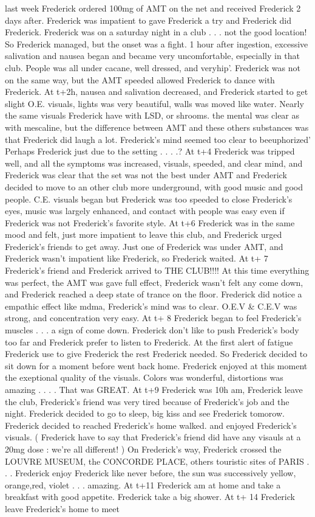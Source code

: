 \documentclass[12pt]{book}
\begin{document}
last week Frederick ordered 100mg of AMT on the net and received Frederick 2 days after. Frederick was impatient to gave Frederick a try and Frederick did Frederick. Frederick was on a saturday night in a club . . .  not the good location! So Frederick managed, but the onset was a fight. 1 hour after ingestion, excessive salivation and nausea began and became very uncomfortable, especially in that club. People was all under cacane, well dressed, and veryhip'. Frederick was not on the same way, but the AMT speeded allowed Frederick to dance with Frederick. At t+2h, nausea and salivation decreased, and Frederick started to get slight O.E. visuals, lights was very beautiful, walls was moved like water. Nearly the same visuals Frederick have with LSD, or shrooms. the mental was clear as with mescaline, but the difference between AMT and these others substances was that Frederick did laugh a lot. Frederick's mind seemed too clear to beeuphorized' Perhaps Frederick just due to the setting . . . .? At t+4 Frederick was tripped well, and all the symptoms was increased, visuals, speeded, and clear mind, and Frederick was clear that the set was not the best under AMT and Frederick decided to move to an other club more underground, with good music and good people. C.E. visuals began but Frederick was too speeded to close Frederick's eyes, music was largely enhanced, and contact with people was easy even if Frederick was not Frederick's favorite style. At t+6 Frederick was in the same mood and felt, just more impatient to leave this club, and Frederick urged Frederick's friends to get away. Just one of Frederick was under AMT, and Frederick wasn't impatient like Frederick, so Frederick waited. At t+ 7 Frederick's friend and Frederick arrived to THE CLUB!!!! At this time everything was perfect, the AMT was gave full effect, Frederick wasn't felt any come down, and Frederick reached a deep state of trance on the floor. Frederick did notice a empathic effect like mdma, Frederick's mind was to clear. O.E.V \& C.E.V was strong, and concentration very easy. At t+ 8 Frederick began to feel Frederick's muscles . . .  a sign of come down. Frederick don't like to push Frederick's body too far and Frederick prefer to listen to Frederick. At the first alert of fatigue Frederick use to give Frederick the rest Frederick needed. So Frederick decided to sit down for a moment before went back home. Frederick enjoyed at this moment the exeptional quality of the visuals. Colors was wonderful, distortions was amazing . . .  . That was GREAT. At t+9 Frederick was 10h am, Frederick leave the club, Frederick's friend was very tired because of Frederick's job and the night. Frederick decided to go to sleep, big kiss and see Frederick tomorow. Frederick decided to reached Frederick's home walked. and enjoyed Frederick's visuals. ( Frederick have to say that Frederick's friend did have any visauls at a 20mg dose : we're all different! ) On Frederick's way, Frederick crossed the LOUVRE MUSEUM, the CONCORDE PLACE, others touristic sites of PARIS . . .  Frederick enjoy Frederick like never before, the sun was successively yellow, orange,red, violet . . .  amazing. At t+11 Frederick am at home and take a breakfast with good appetite. Frederick take a big shower. At t+ 14 Frederick leave Frederick's home to meet 
\end{document}
